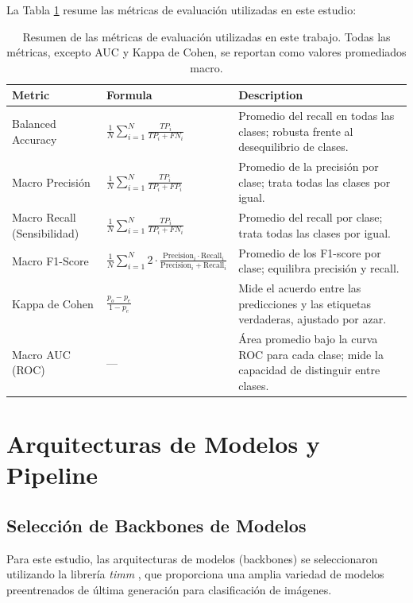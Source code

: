 \documentclass[a4paper,10pt]{book}
\begin{document}
La Tabla \ref{tab:metrics_overview} resume las métricas de evaluación utilizadas en este estudio:

\begin{table}[h!]
\centering
\caption[Resumen de Métricas]{Resumen de las métricas de evaluación utilizadas en este trabajo. Todas las métricas, excepto AUC y Kappa de Cohen, se reportan como valores promediados macro.}
\begin{tabularx}{\textwidth}{l X X}
\toprule
\textbf{Metric} & \textbf{Formula} & \textbf{Description} \\
\midrule
    Balanced Accuracy &
$\frac{1}{N}\sum_{i=1}^N \frac{TP_i}{TP_i + FN_i}$ &
Promedio del recall en todas las clases; robusta frente al desequilibrio de clases. \\
Macro Precisión &
$\frac{1}{N}\sum_{i=1}^N \frac{TP_i}{TP_i + FP_i}$ &
Promedio de la precisión por clase; trata todas las clases por igual. \\
Macro Recall (Sensibilidad) &
$\frac{1}{N}\sum_{i=1}^N \frac{TP_i}{TP_i + FN_i}$ &
Promedio del recall por clase; trata todas las clases por igual. \\
Macro F1-Score &
$\frac{1}{N}\sum_{i=1}^N 2 \cdot \frac{\text{Precision}_i \cdot \text{Recall}_i}{\text{Precision}_i + \text{Recall}_i}$ &
Promedio de los F1-score por clase; equilibra precisión y recall. \\
Kappa de Cohen &
$\frac{p_o - p_e}{1 - p_e}$ &
Mide el acuerdo entre las predicciones y las etiquetas verdaderas, ajustado por azar. \\
Macro AUC (ROC) &
--- &
Área promedio bajo la curva ROC para cada clase; mide la capacidad de distinguir entre clases. \\
\bottomrule
\end{tabularx}
\label{tab:metrics_overview}
\end{table}

\section{Arquitecturas de Modelos y Pipeline}

\subsection{Selección de Backbones de Modelos}

Para este estudio, las arquitecturas de modelos (backbones) se seleccionaron utilizando la librería \textit{timm} \cite{TimmPyTorchImage2025}, que proporciona una amplia variedad de modelos preentrenados de última generación para clasificación de imágenes.
\end{document}
